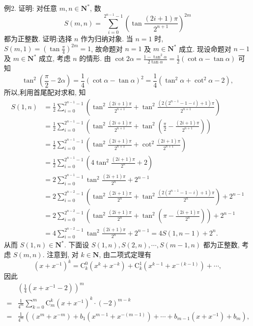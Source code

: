 例2. 证明: 对任意 $m, n \in \mathbf{N}^*$, 数
$$
S(m, n)=\sum_{i=0}^{2^{n-1}-1}\left(\tan \frac{(2 i+1) \pi}{2^{n+1}}\right)^{2 m}
$$
都为正整数.
证明:选择 $n$ 作为归纳对象.
当 $n=1$ 时, $S(m, 1)=\left(\tan \frac{\pi}{4}\right)^{2 m}=1$, 故命题对 $n=1$ 及 $m \in \mathbf{N}^*$ 成立.
现设命题对 $n-1$ 及 $m \in \mathbf{N}^*$ 成立, 考虑 $n$ 的情形.
由 $\cot 2 \alpha=\frac{1-\tan ^2 \alpha}{2 \tan \alpha}=\frac{1}{2}(\cot \alpha-\tan \alpha)$ 可知
$$
\tan ^2\left(\frac{\pi}{2}-2 \alpha\right)=\frac{1}{4}(\cot \alpha-\tan \alpha)^2=\frac{1}{4}\left(\tan ^2 \alpha+\cot ^2 \alpha-2\right),
$$
所以,利用首尾配对求和, 知
$$
\begin{aligned}
S(1, n) & =\frac{1}{2} \sum_{i=0}^{2^{n-1}-1}\left(\tan ^2 \frac{(2 i+1) \pi}{2^{n+1}}+\tan ^2 \frac{\left(2\left(2^{n-1}-1-i\right)+1\right) \pi}{2^{n+1}}\right) \\
& =\frac{1}{2} \sum_{i=0}^{2^{n-1}-1}\left(\tan ^2 \frac{(2 i+1) \pi}{2^{n+1}}+\tan ^2\left(\frac{\pi}{2}-\frac{(2 i+1) \pi}{2^{n+1}}\right)\right) \\
& =\frac{1}{2} \sum_{i=0}^{2^{n-1}-1}\left(\tan ^2 \frac{(2 i+1) \pi}{2^{n+1}}+\cot ^2 \frac{(2 i+1) \pi}{2^{n+1}}\right) \\
& =\frac{1}{2} \sum_{i=0}^{2^{n-1}-1}\left(4 \tan ^2 \frac{(2 i+1) \pi}{2^n}+2\right) \\
& =2 \sum_{i=0}^{2^{n-1}-1} \tan ^2 \frac{(2 i+1) \pi}{2^n}+2^{n-1} \\
& =2 \sum_{i=0}^{2^{n-2}-1}\left(\tan ^2 \frac{(2 i+1) \pi}{2^n}+\tan ^2 \frac{\left(2\left(2^{n-1}-1-i\right)+1\right) \pi}{2^n}\right)+2^{n-1} \\
& =2 \sum_{i=0}^{2^{n-2}-1}\left(\tan ^2 \frac{(2 i+1) \pi}{2^n}+\tan ^2\left(\pi-\frac{(2 i+1) \pi}{2^n}\right)\right)+2^{n-1} \\
& =4 \sum_{i=0}^{2^{n-2}-1} \tan ^2 \frac{(2 i+1) \pi}{2^n}+2^{n-1}=4 S(1, n-1)+2^n .
\end{aligned}
$$
从而 $S(1, n) \in \mathbf{N}^*$.
下面设 $S(1, n), S(2, n), \cdots, S(m-1, n)$ 都为正整数, 考虑 $S(m, n)$.
注意到, 对 $k \in \mathbf{N}$, 由二项式定理有
$$
\left(x+x^{-1}\right)^k=\mathrm{C}_k^0\left(x^k+x^{-k}\right)+\mathrm{C}_k^1\left(x^{k-1}+x^{-(k-1)}\right)+\cdots, \label{eq1}
$$
因此
$$
\begin{aligned}
& \left(\frac{1}{4}\left(x+x^{-1}-2\right)\right)^m \\
= & \frac{1}{4^m} \sum_{k=0}^m \mathrm{C}_m^k\left(x+x^{-1}\right)^k \cdot(-2)^{m-k} \\
= & \frac{1}{4^m}\left(\left(x^m+x^{-m}\right)+b_1\left(x^{m-1}+x^{-(m-1)}\right)+\cdots+b_{m-1}\left(x+x^{-1}\right)+b_m\right),
\end{aligned}
$$
